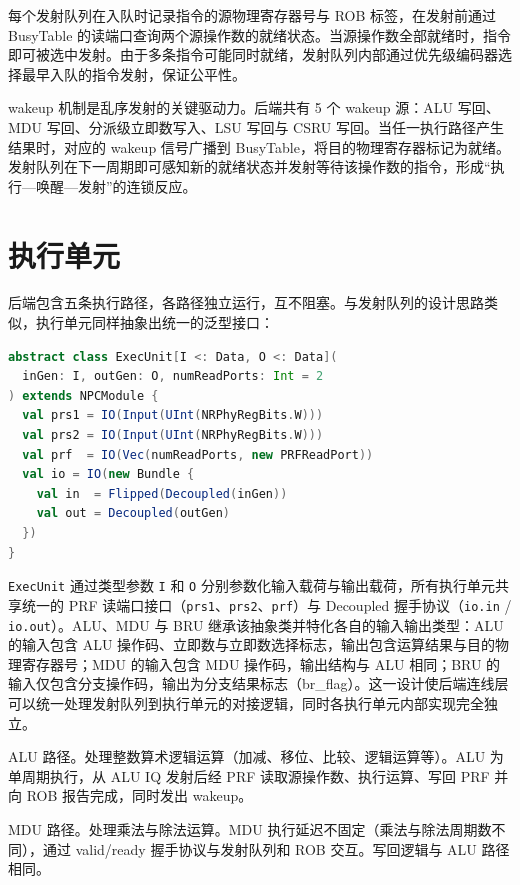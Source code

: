 每个发射队列在入队时记录指令的源物理寄存器号与 ROB 标签，在发射前通过 BusyTable 的读端口查询两个源操作数的就绪状态。当源操作数全部就绪时，指令即可被选中发射。由于多条指令可能同时就绪，发射队列内部通过优先级编码器选择最早入队的指令发射，保证公平性。

wakeup 机制是乱序发射的关键驱动力。后端共有 5 个 wakeup 源：ALU 写回、MDU 写回、分派级立即数写入、LSU 写回与 CSRU 写回。当任一执行路径产生结果时，对应的 wakeup 信号广播到 BusyTable，将目的物理寄存器标记为就绪。发射队列在下一周期即可感知新的就绪状态并发射等待该操作数的指令，形成“执行—唤醒—发射”的连锁反应。

\section{执行单元}

后端包含五条执行路径，各路径独立运行，互不阻塞。与发射队列的设计思路类似，执行单元同样抽象出统一的泛型接口：

\begin{lstlisting}[language=Scala,caption={执行单元抽象基类定义},label={lst:exec-unit-abs}]
abstract class ExecUnit[I <: Data, O <: Data](
  inGen: I, outGen: O, numReadPorts: Int = 2
) extends NPCModule {
  val prs1 = IO(Input(UInt(NRPhyRegBits.W)))
  val prs2 = IO(Input(UInt(NRPhyRegBits.W)))
  val prf  = IO(Vec(numReadPorts, new PRFReadPort))
  val io = IO(new Bundle {
    val in  = Flipped(Decoupled(inGen))
    val out = Decoupled(outGen)
  })
}
\end{lstlisting}

\lstinline|ExecUnit| 通过类型参数 \lstinline|I| 和 \lstinline|O| 分别参数化输入载荷与输出载荷，所有执行单元共享统一的 PRF 读端口接口（\lstinline|prs1|、\lstinline|prs2|、\lstinline|prf|）与 Decoupled 握手协议（\lstinline|io.in| / \lstinline|io.out|）。ALU、MDU 与 BRU 继承该抽象类并特化各自的输入输出类型：ALU 的输入包含 ALU 操作码、立即数与立即数选择标志，输出包含运算结果与目的物理寄存器号；MDU 的输入包含 MDU 操作码，输出结构与 ALU 相同；BRU 的输入仅包含分支操作码，输出为分支结果标志（br\_flag）。这一设计使后端连线层可以统一处理发射队列到执行单元的对接逻辑，同时各执行单元内部实现完全独立。

ALU 路径。处理整数算术逻辑运算（加减、移位、比较、逻辑运算等）。ALU 为单周期执行，从 ALU IQ 发射后经 PRF 读取源操作数、执行运算、写回 PRF 并向 ROB 报告完成，同时发出 wakeup。

MDU 路径。处理乘法与除法运算。MDU 执行延迟不固定（乘法与除法周期数不同），通过 valid/ready 握手协议与发射队列和 ROB 交互。写回逻辑与 ALU 路径相同。

